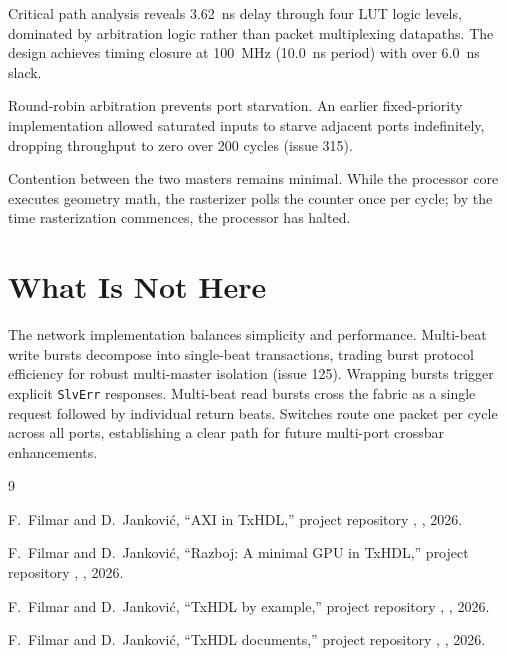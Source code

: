 \documentclass[journal,9pt]{IEEEtran}
\begin{document}
Critical path analysis reveals 3.62~ns delay through four LUT logic levels,
dominated by arbitration logic rather than packet multiplexing datapaths.
The design achieves timing closure at 100~MHz (10.0~ns period) with over
6.0~ns slack.

Round-robin arbitration prevents port starvation. An earlier fixed-priority
implementation allowed saturated inputs to starve adjacent ports indefinitely,
dropping throughput to zero over 200 cycles (issue 315).

Contention between the two masters remains minimal. While the processor core
executes geometry math, the rasterizer polls the counter once per cycle; by
the time rasterization commences, the processor has halted.

\section{What Is Not Here}
\label{sec:n-not}

The network implementation balances simplicity and performance. Multi-beat
write bursts decompose into single-beat transactions, trading burst protocol
efficiency for robust multi-master isolation (issue 125). Wrapping bursts
trigger explicit \texttt{SlvErr} responses. Multi-beat read bursts cross the
fabric as a single request followed by individual return beats. Switches route
one packet per cycle across all ports, establishing a clear path for future
multi-port crossbar enhancements.

\begin{thebibliography}{9}

F.~Filmar and D.~Janković, ``AXI in TxHDL,'' project repository
, , 2026.

F.~Filmar and D.~Janković, ``Razboj: A minimal GPU in TxHDL,'' project
repository , , 2026.

F.~Filmar and D.~Janković, ``TxHDL by example,'' project repository
, , 2026.

F.~Filmar and D.~Janković, ``TxHDL documents,'' project repository
, , 2026.

\end{thebibliography}
\end{document}
